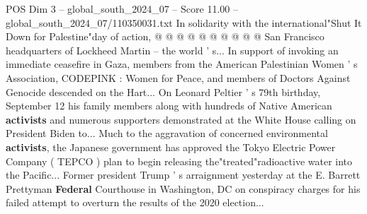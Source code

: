 \begin{textsample}{POS Dim 3 – global\_south\_2024\_07 – Score 11.00 – global\_south\_2024\_07/110350031.txt}
In solidarity with the international"Shut It Down for Palestine"day of action, @ @ @ @ @ @ @ @ @ @ San Francisco headquarters of Lockheed Martin -- the world ' s...
In support of invoking an immediate ceasefire in Gaza, members from the American Palestinian Women ' s Association, CODEPINK : Women for Peace, and members of Doctors Against Genocide descended on the Hart...
On Leonard Peltier ' s 79th birthday, September 12 his family members along with hundreds of Native American \textbf{activists} and numerous supporters demonstrated at the White House calling on President Biden to...
Much to the aggravation of concerned environmental \textbf{activists}, the Japanese government has approved the Tokyo Electric Power Company ( TEPCO ) plan to begin releasing the"treated"radioactive water into the Pacific...
Former president Trump ' s arraignment yesterday at the E.
Barrett Prettyman \textbf{Federal} Courthouse in Washington, DC on conspiracy charges for his failed attempt to overturn the results of the 2020 election...

\end{textsample}

